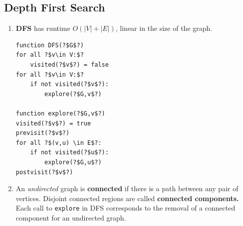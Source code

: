 \documentclass[10pt]{article}
\begin{document}
\begin{multicols}{2}
\begin{addmargin}[0.8em]{0.5em}
    \subsection{Depth First Search}
    \begin{enumerate}[label=(\alph*)]
        \item \textbf{DFS} has runtime $O(|V| + |E|)$, linear in the size of the graph.
        \begin{verbatim}
function DFS(?$G$?)
for all ?$v\in V:$?
    visited(?$v$?) = false
for all ?$v\in V:$?
    if not visited(?$v$?):
        explore(?$G,v$?)
        
function explore(?$G,v$?) 
visited(?$v$?) = true
previsit(?$v$?)
for all ?$(v,u) \in E$?:
    if not visited(?$u$?):
        explore(?$G,u$?)
postvisit(?$v$?)
        \end{verbatim}
        \item An \textit{undirected} graph is \textbf{connected} if there is a path between any pair of vertices. Disjoint connected regions are called \textbf{connected components.} Each call to \texttt{explore} in DFS corresponds to the removal of a connected component for an undirected graph. 
        

\end{enumerate}
\end{addmargin}
\end{multicols}
\end{document}
